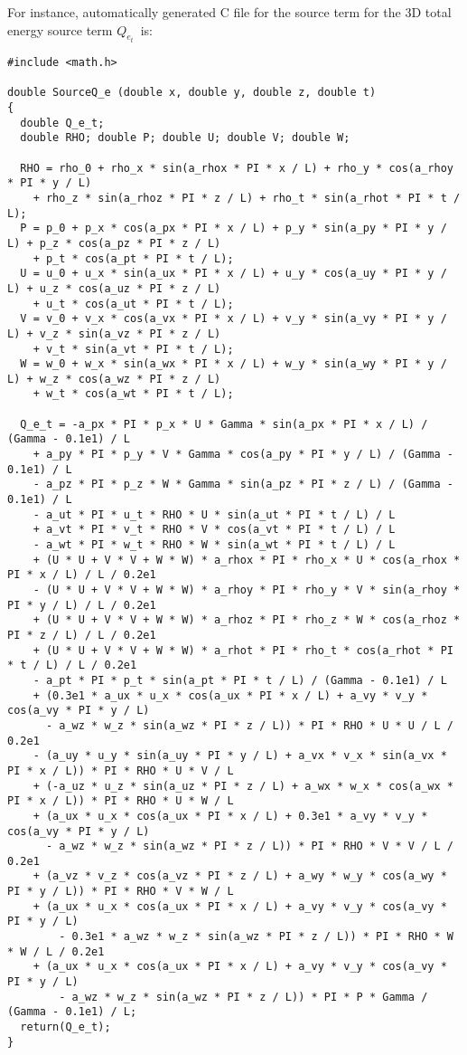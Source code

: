 \documentclass[10pt]{article}
\begin{document}
For instance, automatically generated C file for the source term for the 3D total energy source term $Q_{e_t}$~is:
\begin{small}
\begin{verbatim}
#include <math.h>

double SourceQ_e (double x, double y, double z, double t)
{
  double Q_e_t;
  double RHO; double P; double U; double V; double W;

  RHO = rho_0 + rho_x * sin(a_rhox * PI * x / L) + rho_y * cos(a_rhoy * PI * y / L)
    + rho_z * sin(a_rhoz * PI * z / L) + rho_t * sin(a_rhot * PI * t / L);
  P = p_0 + p_x * cos(a_px * PI * x / L) + p_y * sin(a_py * PI * y / L) + p_z * cos(a_pz * PI * z / L)
    + p_t * cos(a_pt * PI * t / L);
  U = u_0 + u_x * sin(a_ux * PI * x / L) + u_y * cos(a_uy * PI * y / L) + u_z * cos(a_uz * PI * z / L)
    + u_t * cos(a_ut * PI * t / L);
  V = v_0 + v_x * cos(a_vx * PI * x / L) + v_y * sin(a_vy * PI * y / L) + v_z * sin(a_vz * PI * z / L)
    + v_t * sin(a_vt * PI * t / L);
  W = w_0 + w_x * sin(a_wx * PI * x / L) + w_y * sin(a_wy * PI * y / L) + w_z * cos(a_wz * PI * z / L)
    + w_t * cos(a_wt * PI * t / L);

  Q_e_t = -a_px * PI * p_x * U * Gamma * sin(a_px * PI * x / L) / (Gamma - 0.1e1) / L
    + a_py * PI * p_y * V * Gamma * cos(a_py * PI * y / L) / (Gamma - 0.1e1) / L
    - a_pz * PI * p_z * W * Gamma * sin(a_pz * PI * z / L) / (Gamma - 0.1e1) / L
    - a_ut * PI * u_t * RHO * U * sin(a_ut * PI * t / L) / L
    + a_vt * PI * v_t * RHO * V * cos(a_vt * PI * t / L) / L
    - a_wt * PI * w_t * RHO * W * sin(a_wt * PI * t / L) / L
    + (U * U + V * V + W * W) * a_rhox * PI * rho_x * U * cos(a_rhox * PI * x / L) / L / 0.2e1
    - (U * U + V * V + W * W) * a_rhoy * PI * rho_y * V * sin(a_rhoy * PI * y / L) / L / 0.2e1
    + (U * U + V * V + W * W) * a_rhoz * PI * rho_z * W * cos(a_rhoz * PI * z / L) / L / 0.2e1
    + (U * U + V * V + W * W) * a_rhot * PI * rho_t * cos(a_rhot * PI * t / L) / L / 0.2e1
    - a_pt * PI * p_t * sin(a_pt * PI * t / L) / (Gamma - 0.1e1) / L
    + (0.3e1 * a_ux * u_x * cos(a_ux * PI * x / L) + a_vy * v_y * cos(a_vy * PI * y / L)
      - a_wz * w_z * sin(a_wz * PI * z / L)) * PI * RHO * U * U / L / 0.2e1
    - (a_uy * u_y * sin(a_uy * PI * y / L) + a_vx * v_x * sin(a_vx * PI * x / L)) * PI * RHO * U * V / L
    + (-a_uz * u_z * sin(a_uz * PI * z / L) + a_wx * w_x * cos(a_wx * PI * x / L)) * PI * RHO * U * W / L
    + (a_ux * u_x * cos(a_ux * PI * x / L) + 0.3e1 * a_vy * v_y * cos(a_vy * PI * y / L)
      - a_wz * w_z * sin(a_wz * PI * z / L)) * PI * RHO * V * V / L / 0.2e1
    + (a_vz * v_z * cos(a_vz * PI * z / L) + a_wy * w_y * cos(a_wy * PI * y / L)) * PI * RHO * V * W / L
    + (a_ux * u_x * cos(a_ux * PI * x / L) + a_vy * v_y * cos(a_vy * PI * y / L)
        - 0.3e1 * a_wz * w_z * sin(a_wz * PI * z / L)) * PI * RHO * W * W / L / 0.2e1
    + (a_ux * u_x * cos(a_ux * PI * x / L) + a_vy * v_y * cos(a_vy * PI * y / L)
        - a_wz * w_z * sin(a_wz * PI * z / L)) * PI * P * Gamma / (Gamma - 0.1e1) / L;
  return(Q_e_t);
}
\end{verbatim}
\end{small}
 

\end{document}
